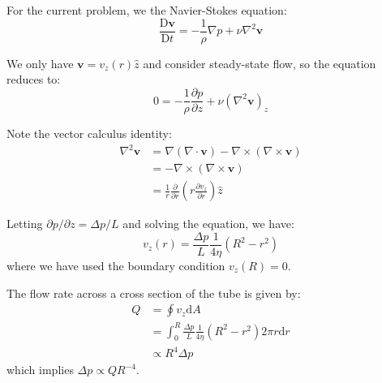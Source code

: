 \documentclass[12pt]{article}
\begin{document}



\pagebreak
\section*{}



For the current problem, we the Navier-Stokes equation:
\begin{equation}
    \frac{\mathrm{D}\mathbf{v}}{\mathrm{D}t} = -\frac{1}{\rho}\nabla p + \nu \nabla^{2} \mathbf{v}
\end{equation}

We only have $\mathbf{v} = v_{z}(r)\hat{z}$ and consider steady-state flow, so the equation reduces to:
\begin{equation}
    0 = -\frac{1}{\rho} \frac{\partial p}{\partial z} + \nu (\nabla^{2} \mathbf{v})_{z}
\end{equation}

Note the vector calculus identity:
\begin{equation}
    \begin{split}
        \nabla^{2} \mathbf{v} &= \nabla (\nabla \cdot \mathbf{v}) - \nabla \times (\nabla \times \mathbf{v}) \\
        &= -\nabla \times (\nabla \times \mathbf{v}) \\
        &= \frac{1}{r} \frac{\partial}{\partial r} \left( r \frac{\partial v_{z}}{\partial r} \right) \hat{z}
    \end{split}
\end{equation}

Letting $\partial p/\partial z = \Delta p/L$ and solving the equation, we have:
\begin{equation}
    v_{z}(r) = \frac{\Delta p}{L} \frac{1}{4\eta} (R^{2} - r^{2})
\end{equation}
where we have used the boundary condition $v_{z}(R) = 0$.

The flow rate across a cross section of the tube is given by:
\begin{equation}
    \begin{split}
        Q &= \oint v_{z} \mathrm{d}A \\
        &= \int_{0}^{R} \frac{\Delta p}{L} \frac{1}{4\eta} (R^{2} - r^{2}) 2\pi r \mathrm{d}r \\
        &\propto R^{4} \Delta p
    \end{split}
\end{equation}
which implies $\Delta p \propto QR^{-4}$.
\end{document}
